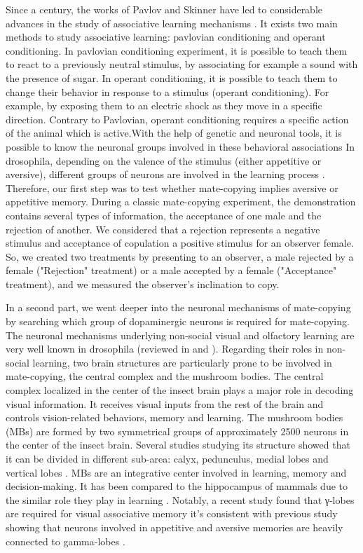 \documentclass[a4paper, 12pt]{article}
\begin{document}
Since a century, the works of Pavlov and Skinner have led to considerable advances in the study of associative learning mechanisms \parencite{pavlov_conditioned_1927, iversen_skinners_1992}. It exists two main methods to study associative learning: pavlovian conditioning and operant conditioning. In pavlovian conditioning experiment, it is possible to teach them to react to a previously neutral stimulus, by associating for example a sound with the presence of sugar. In operant conditioning, it is possible to teach them to change their behavior in response to a stimulus (operant conditioning). For example, by exposing them to an electric shock as they move in a specific direction. Contrary to Pavlovian, operant conditioning requires a specific action of the animal which is active.With the help of genetic and neuronal tools, it is possible to know the neuronal groups involved  in these behavioral associations In drosophila, depending on the valence of the stimulus (either appetitive or aversive), different groups of neurons are involved in the learning process \parencite{vogt_shared_2014, busto_olfactory_2010}. Therefore, our first step was to test whether mate-copying implies aversive or appetitive memory. During a classic mate-copying experiment, the demonstration contains several types of information, the acceptance of one male and the rejection of another. We considered that a rejection represents a negative stimulus and acceptance of copulation a positive stimulus for an observer female. So, we created two treatments by presenting to an observer, a male rejected by a female ("Rejection" treatment) or a male accepted by a female ("Acceptance" treatment), and we measured the observer’s inclination to copy. 
	
In a second part, we went deeper into the neuronal mechanisms of mate-copying by searching which group of dopaminergic neurons is required for mate-copying. The neuronal mechanisms underlying non-social visual and olfactory learning are very well known in drosophila (reviewed in \textcite{ guo_vision_2017} and \textcite{cognigni_right_2018}). Regarding their roles in non-social learning, two brain structures are particularly prone to be involved in mate-copying, the central complex and the mushroom bodies. The central complex localized in the center of the insect brain plays a major role in decoding visual information. It receives visual inputs from the rest of the brain and controls vision-related behaviors, memory and learning. The mushroom bodies (MBs) are formed by two symmetrical groups of approximately 2500 neurons in the center of the insect brain. Several studies studying its structure showed that it can be divided in different sub-area: calyx, pedunculus, medial lobes and vertical lobes \parencite{aso_neuronal_2016}. MBs are an integrative center involved in learning, memory and decision-making. It has been compared to the hippocampus of mammals due to the similar role they play in learning \parencite{strausfeld_evolution_1998}.	Notably, a recent study found that γ-lobes are required for visual associative memory \parencite{ vogt_shared_2014} it's consistent with previous study showing that neurons involved in appetitive and aversive memories are heavily connected to gamma-lobes \parencite{cladrige-chang_writing_2009, burke_ layered_2012}.
	
\end{document}
